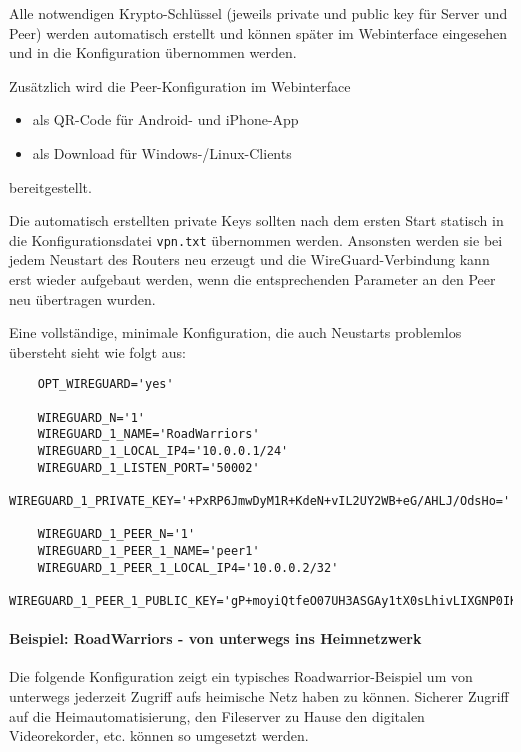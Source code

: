Alle notwendigen Krypto-Schlüssel (jeweils private und public key für Server und
Peer) werden automatisch erstellt und können später im Webinterface eingesehen und
in die Konfiguration übernommen werden.

Zusätzlich wird die Peer-Konfiguration im Webinterface

\begin{itemize}
    \item als QR-Code für Android- und iPhone-App
    \item als Download für Windows-/Linux-Clients
\end{itemize}

bereitgestellt.

Die automatisch erstellten private Keys sollten nach dem ersten Start
statisch in die Konfigurationsdatei \texttt{vpn.txt} übernommen werden.
Ansonsten werden sie bei jedem Neustart des Routers neu erzeugt und die
WireGuard-Verbindung kann erst wieder aufgebaut werden, wenn die
entsprechenden Parameter an den Peer neu übertragen wurden.

Eine vollständige, minimale Konfiguration, die auch Neustarts problemlos übersteht
sieht wie folgt aus:

\begin{example}
\begin{verbatim}
    OPT_WIREGUARD='yes'

    WIREGUARD_N='1'
    WIREGUARD_1_NAME='RoadWarriors'
    WIREGUARD_1_LOCAL_IP4='10.0.0.1/24'
    WIREGUARD_1_LISTEN_PORT='50002'
    WIREGUARD_1_PRIVATE_KEY='+PxRP6JmwDyM1R+KdeN+vIL2UY2WB+eG/AHLJ/OdsHo='

    WIREGUARD_1_PEER_N='1'
    WIREGUARD_1_PEER_1_NAME='peer1'
    WIREGUARD_1_PEER_1_LOCAL_IP4='10.0.0.2/32'
    WIREGUARD_1_PEER_1_PUBLIC_KEY='gP+moyiQtfeO07UH3ASGAy1tX0sLhivLIXGNP0IKbG8='
\end{verbatim}
\end{example}


\paragraph{Beispiel: RoadWarriors - von unterwegs ins Heimnetzwerk}

\noindent


Die folgende Konfiguration zeigt ein typisches Roadwarrior-Beispiel um von unterwegs jederzeit 
Zugriff aufs heimische Netz haben zu können. Sicherer Zugriff auf die Heimautomatisierung, den 
Fileserver zu Hause den digitalen Videorekorder, etc. können so umgesetzt werden.

